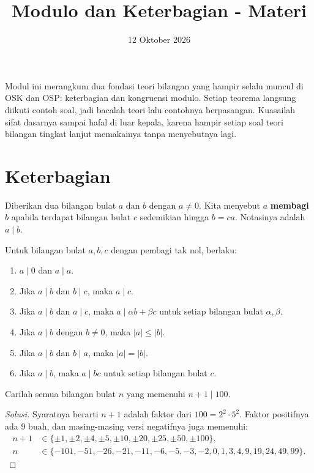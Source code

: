 \documentclass[12pt]{scrartcl}
\title{Modulo dan Keterbagian - Materi}
\date{12 Oktober 2026}
\begin{document}
\maketitle

\renewcommand*\contentsname{Daftar Isi}
\tableofcontents

\newpage

Modul ini merangkum dua fondasi teori bilangan yang hampir selalu muncul di OSK dan OSP:
keterbagian dan kongruensi modulo. Setiap teorema langsung diikuti contoh soal,
jadi bacalah teori lalu contohnya berpasangan.
Kuasailah sifat dasarnya sampai hafal di luar kepala,
karena hampir setiap soal teori bilangan tingkat lanjut memakainya tanpa menyebutnya lagi.

\section{Keterbagian}

\begin{definition}
Diberikan dua bilangan bulat $a$ dan $b$ dengan $a \ne 0$.
Kita menyebut $a$ \textbf{membagi} $b$ apabila terdapat bilangan bulat $c$
sedemikian hingga $b = ca$. Notasinya adalah $a \mid b$.
\end{definition}

\begin{fact}
Untuk bilangan bulat $a, b, c$ dengan pembagi tak nol, berlaku:
\begin{enumerate}
    \item $a \mid 0$ dan $a \mid a$.
    \item Jika $a \mid b$ dan $b \mid c$, maka $a \mid c$.
    \item Jika $a \mid b$ dan $a \mid c$, maka
    $a \mid \alpha b + \beta c$ untuk setiap bilangan bulat $\alpha, \beta$.
    \item Jika $a \mid b$ dengan $b \ne 0$, maka $|a| \le |b|$.
    \item Jika $a \mid b$ dan $b \mid a$, maka $|a| = |b|$.
    \item Jika $a \mid b$, maka $a \mid bc$ untuk setiap bilangan bulat $c$.
\end{enumerate}
\end{fact}

\begin{example}
Carilah semua bilangan bulat $n$ yang memenuhi $n + 1 \mid 100$.
\end{example}
\begin{proof}[Solusi]
Syaratnya berarti $n + 1$ adalah faktor dari $100 = 2^2 \cdot 5^2$.
Faktor positifnya ada $9$ buah, dan masing-masing versi negatifnya juga memenuhi:
\begin{align*}
n + 1 &\in \{\pm 1, \pm 2, \pm 4, \pm 5, \pm 10, \pm 20, \pm 25, \pm 50, \pm 100\}, \\
n &\in \{-101, -51, -26, -21, -11, -6, -5, -3, -2, 0, 1, 3, 4, 9, 19, 24, 49, 99\}.
\end{align*}
\end{proof}
\end{document}
